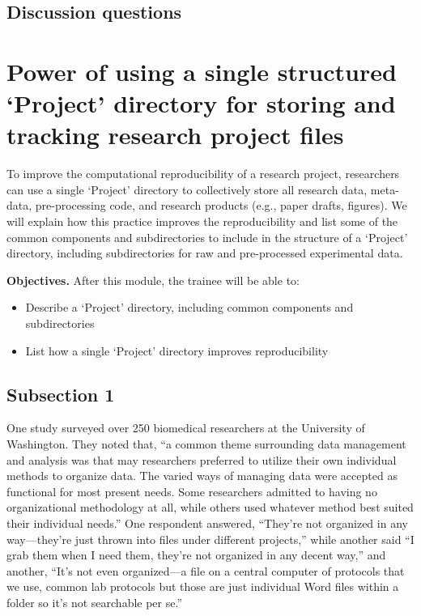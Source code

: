 \documentclass[]{tufte-book}
\providecommand{\tightlist}{%
  \setlength{\itemsep}{0pt}\setlength{\parskip}{0pt}}
\begin{document}
\hypertarget{discussion-questions-1}{%
\subsection{Discussion questions}\label{discussion-questions-1}}

\hypertarget{power-of-using-a-single-structured-project-directory-for-storing-and-tracking-research-project-files}{%
\section{Power of using a single structured `Project' directory for storing and tracking research project files}\label{power-of-using-a-single-structured-project-directory-for-storing-and-tracking-research-project-files}}

To improve the computational reproducibility of a research project, researchers
can use a single `Project' directory to collectively store all research data,
meta-data, pre-processing code, and research products (e.g., paper drafts,
figures). We will explain how this practice improves the reproducibility and
list some of the common components and subdirectories to include in the
structure of a `Project' directory, including subdirectories for raw and
pre-processed experimental data.

\textbf{Objectives.} After this module, the trainee will be able to:

\begin{itemize}
\tightlist
\item
  Describe a `Project' directory, including common components and subdirectories
\item
  List how a single `Project' directory improves reproducibility
\end{itemize}

\hypertarget{subsection-1-2}{%
\subsection{Subsection 1}\label{subsection-1-2}}

One study surveyed over 250 biomedical researchers at the University of Washington.
They noted that, ``a common theme surrounding data management and analysis was that
may researchers preferred to utilize their own individual methods to organize data.
The varied ways of managing data were accepted as functional for most present needs.
Some researchers admitted to having no organizational methodology at all, while others
used whatever method best suited their individual needs.'' \citep{anderson2007issues}
One respondent answered, ``They're not organized in any way---they're just thrown into
files under different projects,'' while another said ``I grab them when I need them, they're
not organized in any decent way,'' and another, ``It's not even organized---a file on a central
computer of protocols that we use, common lab protocols but those are just individual
Word files within a folder so it's not searchable per se.'' \citep{anderson2007issues}
\end{document}
